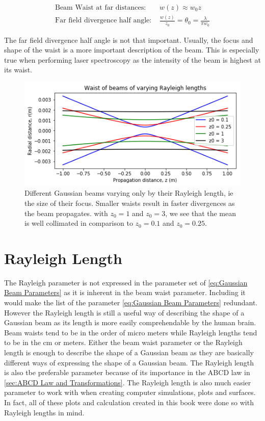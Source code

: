 \documentclass[11pt,a4paper]{book}
\begin{document}
		\begin{equation}
		\begin{split}
		\text{Beam Waist at far distances: } & w(z) \approx w_0 z\\
		\text{Far field divergence half angle: } & \frac{w(z)}{z_0} = \theta_0 = \frac{\lambda}{\pi w_0}
		\end{split}
		\end{equation}
		
		\noindent The far field divergence half angle is not that important. Usually, the focus and shape of the waist is a more important description of the beam. This is especially true when performing laser spectroscopy as the intensity of the beam is highest at its waist.
		
		\begin{figure} 
		\centering
		\includegraphics[scale=0.9]{images/chapter-3/Gaussian_beams_waists}
		\caption{Different Gaussian beams varying only by their Rayleigh length, ie the size of their focus. Smaller waists result in faster divergences as the beam propagates. with $z_0 = 1$ and $z_0 = 3$, we see that the mean is well collimated in comparison to $z_0 = 0.1$ and  $z_0 = 0.25$.  }
		\label{fig:Gaussian_beams_waists}	
		\end{figure}
	
	\section{Rayleigh Length}
		\label{sec:Rayleigh Length}
		The Rayleigh parameter is not expressed in the parameter set of \autoref{eq:Gaussian Beam Parameters} as it is inherent in the beam waist parameter. Including it would make the list of the parameter \autoref{eq:Gaussian Beam Parameters} redundant. However the Rayleigh length is still a useful way of describing the shape of a Gaussian beam as its length is more easily comprehendable by the human brain. Beam waists tend to be in the order of micro meters while Rayleigh lengths tend to be in the cm or meters. Either the beam waist parameter or the Rayleigh length is enough to describe the shape of a Gaussian beam as they are basically different ways of expressing the shape of a Gaussian beam. The Rayleigh length is also tbe preferable parameter because of its importance in the ABCD law in \autoref{sec:ABCD Law and Transformations}. The Rayleigh length is also much easier parameter to work with when creating computer simulations, plots and surfaces. In fact, all of these plots and calculation created in this book were done so with Rayleigh lengths in mind.
		
\end{document}
